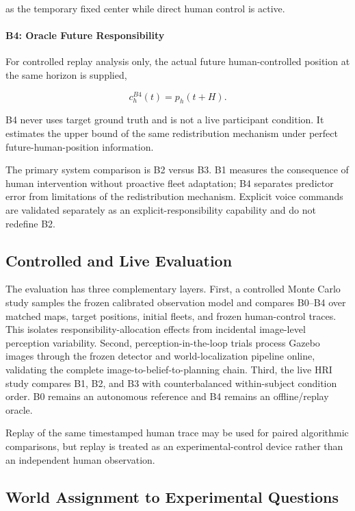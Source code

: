 \documentclass[conference]{IEEEtran}
\begin{document}
as the temporary fixed center while direct human control is active.

\paragraph{B4: Oracle Future Responsibility}
For controlled replay analysis only, the actual future human-controlled
position at the same horizon is supplied,

\begin{equation}
c_h^{B4}(t)=p_h(t+H).
\label{eq:b4_stagee}
\end{equation}

B4 never uses target ground truth and is not a live participant condition. It
estimates the upper bound of the same redistribution mechanism under perfect
future-human-position information.

The primary system comparison is B2 versus B3. B1 measures the consequence of
human intervention without proactive fleet adaptation; B4 separates predictor
error from limitations of the redistribution mechanism. Explicit voice
commands are validated separately as an explicit-responsibility capability and
do not redefine B2.

\subsection{Controlled and Live Evaluation}

The evaluation has three complementary layers. First, a controlled Monte Carlo
study samples the frozen calibrated observation model and compares B0--B4 over
matched maps, target positions, initial fleets, and frozen human-control traces.
This isolates responsibility-allocation effects from incidental image-level
perception variability. Second, perception-in-the-loop trials process Gazebo
images through the frozen detector and world-localization pipeline online,
validating the complete image-to-belief-to-planning chain. Third, the live HRI
study compares B1, B2, and B3 with counterbalanced within-subject condition
order. B0 remains an autonomous reference and B4 remains an offline/replay
oracle.

Replay of the same timestamped human trace may be used for paired algorithmic
comparisons, but replay is treated as an experimental-control device rather
than an independent human observation.

\subsection{World Assignment to Experimental Questions}
\end{document}
